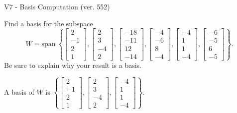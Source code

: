 \begin{exercise}
  \begin{exerciseTitle}V7 - Basis Computation (ver. 552)\end{exerciseTitle}
  \begin{exerciseStatement}
    Find a basis for the subspace 
\[W=\mathrm{span}\ \left\{\left[\begin{array}{r}
2 \\
-1 \\
2 \\
1
\end{array}\right] , \left[\begin{array}{r}
2 \\
3 \\
-4 \\
2
\end{array}\right] , \left[\begin{array}{r}
-18 \\
-11 \\
12 \\
-14
\end{array}\right] , \left[\begin{array}{r}
-4 \\
-6 \\
8 \\
-4
\end{array}\right] , \left[\begin{array}{r}
-4 \\
1 \\
1 \\
-4
\end{array}\right] , \left[\begin{array}{r}
-6 \\
-5 \\
6 \\
-5
\end{array}\right]\right\}.\]
 Be sure to explain why your result is a basis.


  \end{exerciseStatement}
  \begin{exerciseAnswer}
   A basis of \(W\) is  \(\left\{\left[\begin{array}{r}
2 \\
-1 \\
2 \\
1
\end{array}\right] , \left[\begin{array}{r}
2 \\
3 \\
-4 \\
2
\end{array}\right] , \left[\begin{array}{r}
-4 \\
1 \\
1 \\
-4
\end{array}\right]\right\}\).
  


  \end{exerciseAnswer}
\end{exercise}